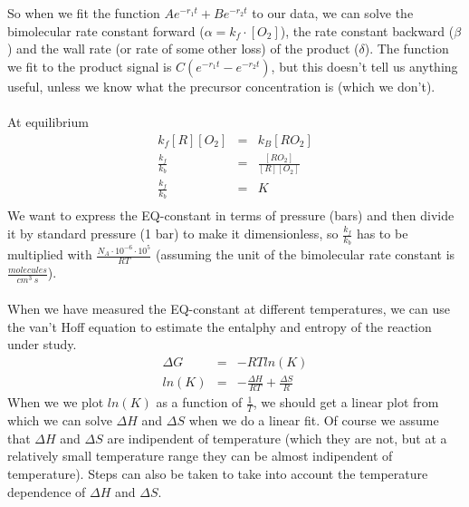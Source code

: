 \documentclass[10pt, a4paper]{article}
\begin{document}
~\\
~\\
So when we fit the function $Ae^{-r_1 t} + Be^{-r_2t}$ to our data, we can solve the bimolecular rate constant forward ($\alpha = k_f \cdot [O_2]$), the rate constant backward ($\beta$) and the wall rate (or rate of some other loss) of the product ($\delta$). The function we fit to the product signal is $C(e^{-r_1 t} - e^{-r_2t})$, but this doesn't tell us anything useful, unless we know what the precursor concentration is (which we don't). 
~\\
~\\
At equilibrium 
\begin{eqnarray*}
k_f [R][O_2] &=& k_B [RO_2] \\
\frac{k_f}{k_b} &=& \frac{[RO_2]}{[R][O_2]} \\
\frac{k_f}{k_b} &=& K \\
\end{eqnarray*}
We want to express the EQ-constant in terms of pressure (bars) and then divide it by standard pressure (1 bar) to make it dimensionless, so $ \frac{k_f}{k_b}$ has to be multiplied with $ \frac{N_A \cdot 10^{-6} \cdot 10^5}{RT}$ (assuming the unit of the bimolecular rate constant is $\frac{molecules}{cm^3 \: s}$). 
~\\
~\\
When we have measured the EQ-constant at different temperatures, we can use the van't Hoff equation to estimate the entalphy and entropy of the reaction under study. 
\begin{eqnarray*}
\Delta G &=& -RTln(K) \\
ln(K) &=& -\frac{\Delta H}{RT} + \frac{\Delta S}{R} 
\end{eqnarray*}
When we we plot $ln(K)$ as a function of $ \frac{1}{T}$, we should get a linear plot from which we can solve $\Delta H$ and $\Delta S$ when we do a linear fit. Of course we assume that $\Delta H$ and $\Delta S$ are indipendent of temperature (which they are not, but at a relatively small temperature range they can be almost indipendent of temperature). Steps can also be taken to take into account the temperature dependence of $\Delta H$ and $\Delta S$. 
\end{document}
